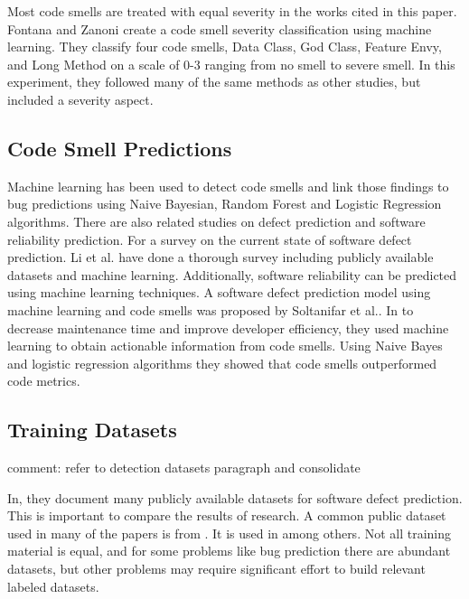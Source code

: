 \documentclass[conference]{IEEEtran}
\begin{document}
Most code smells are treated with equal severity in the works cited in this paper. Fontana and Zanoni\cite{fontana_code_2017} create a code smell severity classification using machine learning. They classify four code smells, Data Class, God Class, Feature Envy, and Long Method on a scale of 0-3 ranging from no smell to severe smell. In this experiment, they followed many of the same methods as other studies, but included a severity aspect.

\subsection{Code Smell Predictions}
Machine learning has been used to detect code smells and link those findings to bug predictions\cite{ubayawardana_bug_2018} using Naive Bayesian, Random Forest and Logistic Regression algorithms.
There are also related studies on defect prediction and software reliability prediction.
For a survey on the current state of software defect prediction\cite{li_progress_2018}. Li et al. have done a thorough survey including publicly available datasets and machine learning.
Additionally, software reliability can be predicted using machine learning techniques\cite{kulamala_predicting_2018}.
A software defect prediction model using machine learning and code smells was proposed by Soltanifar et al.\cite{soltanifar_software_2016}. In\cite{soltanifar_software_2016} to decrease maintenance time and improve developer efficiency, they used machine learning to obtain actionable information from code smells. Using Naive Bayes and logistic regression algorithms they showed that code smells outperformed code metrics.

\subsection{Training Datasets}
comment: refer to detection datasets paragraph and consolidate

In\cite{li_progress_2018}, they document many publicly available datasets for software defect prediction. This is important to compare the results of research.
A common public dataset used in many of the papers is from \cite{fontana_code_2017}. It is used in \cite{karaduzovic-hadziabdic_comparison_2018} among others.
Not all training material is equal\cite{fakhoury_keep_2018}, and for some problems like bug prediction there are abundant datasets, but other problems may require significant effort to build relevant labeled datasets.
\end{document}
